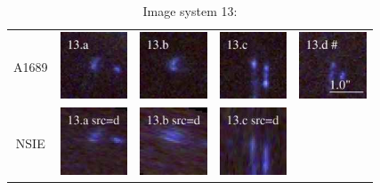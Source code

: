 \documentclass[useAMS,usenatbib]{mn2e}
\begin{document}
\clearpage

\begin{table}
  \caption{Image system 13:}\vspace{0mm}
  \begin{tabular}{ccccc}
    \multicolumn{1}{m{1cm}}{{\Large A1689}}
    & \multicolumn{1}{m{1.7cm}}{\includegraphics[height=2.00cm,clip]{figs/nsie_img/rgb.img_13_a.ps}}
    & \multicolumn{1}{m{1.7cm}}{\includegraphics[height=2.00cm,clip]{figs/nsie_img/rgb.img_13_b.ps}}
    & \multicolumn{1}{m{1.7cm}}{\includegraphics[height=2.00cm,clip]{figs/nsie_img/rgb.img_13_c.ps}}
    & \multicolumn{1}{m{1.7cm}}{\includegraphics[height=2.00cm,clip]{figs/nsie_img/rgb.img_13_d.ps}} \\
    \multicolumn{1}{m{1cm}}{{\Large NSIE}}
    & \multicolumn{1}{m{1.7cm}}{\includegraphics[height=2.00cm,clip]{figs/nsie_img/rgb.pre_13_a_d_tri.ps}}
    & \multicolumn{1}{m{1.7cm}}{\includegraphics[height=2.00cm,clip]{figs/nsie_img/rgb.pre_13_b_d_tri.ps}}
    & \multicolumn{1}{m{1.7cm}}{\includegraphics[height=2.00cm,clip]{figs/nsie_img/rgb.pre_13_c_d_tri.ps}}

\end{tabular}
\end{table}
\end{document}
